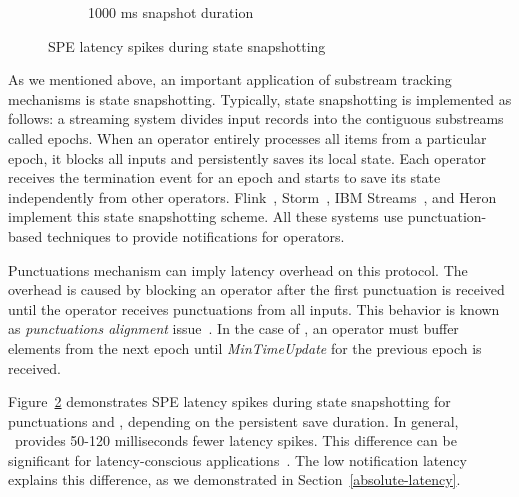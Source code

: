 \begin{figure}[t!]
\begin{subfigure}[b]{0.32\textwidth}
            \caption{1000 ms snapshot duration}
            \label{1000ms_snapshot}
    \end{subfigure}
    \caption{SPE latency spikes during state snapshotting}
    \label{snapshot_spikes}
\end{figure}

As we mentioned above, an important application of substream tracking mechanisms is state snapshotting. Typically, state snapshotting is implemented as follows: a streaming system divides input records into the contiguous substreams called epochs. When an operator entirely processes all items from a particular epoch, it blocks all inputs and persistently saves its local state. Each operator receives the termination event for an epoch and starts to save its state independently from other operators. Flink~\cite{Carbone:2017:SMA:3137765.3137777}, Storm~\cite{apache:storm:state}, IBM Streams~\cite{jacques2016consistent}, and Heron~\cite{Kulkarni:2015:THS:2723372.2742788} implement this state snapshotting scheme. All these systems use punctuation-based techniques to provide notifications for operators.

Punctuations mechanism can imply latency overhead on this protocol. The overhead is caused by blocking an operator after the first punctuation is received until the operator receives punctuations from all inputs. This behavior is known as {\em punctuations alignment} issue~\cite{Carbone:2017:SMA:3137765.3137777}. In the case of \tracker , an operator must buffer elements from the next epoch until {\em MinTimeUpdate} for the previous epoch is received.

Figure~\ref{snapshot_spikes} demonstrates SPE latency spikes during state snapshotting for punctuations and \tracker, depending on the persistent save duration. In general, \tracker\ provides 50-120 milliseconds fewer latency spikes. This difference can be significant for latency-conscious applications~\cite{zhang2017sub}. The low notification latency explains this difference, as we demonstrated in Section~\ref{absolute-latency}. 


